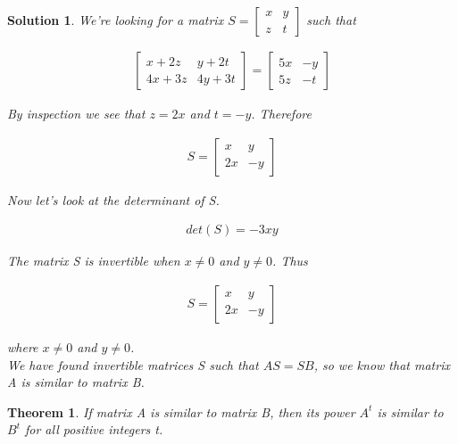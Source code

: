 \documentclass{article}
\newtheorem{theorem}{Theorem}
\newtheorem*{solution}{Solution}
\begin{document}
\begin{solution}
We're looking for a matrix $S = \begin{bmatrix} x & y \\ z & t \end{bmatrix}$ such that

\begin{align*}
\begin{bmatrix}x + 2z & y + 2t \\ 4x + 3z & 4y + 3t\end{bmatrix} = \begin{bmatrix}5x & -y \\ 5z & -t\end{bmatrix}
\end{align*}

By inspection we see that $z = 2x$ and $t = -y$. Therefore

\begin{align*}
S = \begin{bmatrix} x & y \\ 2x & -y \end{bmatrix} 
\end{align*}

Now let's look at the determinant of S.

\begin{align*}
det(S) = -3xy
\end{align*}

The matrix S is invertible when $x \neq 0$ and $y \neq 0$. Thus 

\begin{align*}
S = \begin{bmatrix} x & y \\ 2x & -y \end{bmatrix} 
\end{align*}

where $x \neq 0$ and $y \neq 0$. \\

We have found invertible matrices S such that $AS = SB$, so we know that matrix A is similar to matrix B. 

\end{solution}

\begin{theorem}
If matrix A is similar to matrix B, then its power $A^{t}$ is similar to $B^{t}$ for all positive integers t.
\end{theorem}
\end{document}
